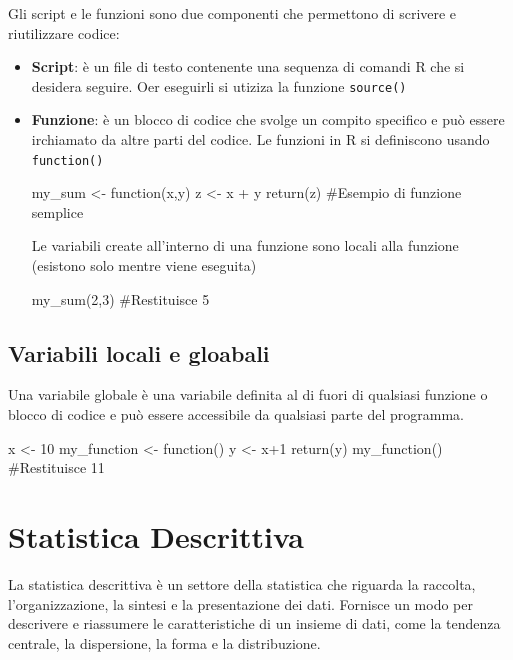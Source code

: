 Gli script e le funzioni sono due componenti che permettono di scrivere e riutilizzare codice:
\begin{itemize}
  \item \textbf{Script}: è un file di testo contenente una sequenza di comandi R che si desidera seguire. Oer eseguirli si utiziza la funzione \texttt{source()}
  \item \textbf{Funzione}: è un blocco di codice che svolge un compito specifico e può essere irchiamato da altre parti del codice. Le funzioni in R si definiscono usando \texttt{function()}
  
  \begin{codiceR}
    my_sum <- function(x,y){
      z <- x + y
      return(z)
      }
  #Esempio di funzione semplice
  \end{codiceR}
  Le variabili create all'interno di una funzione sono locali alla funzione (esistono solo mentre viene eseguita)

  \begin{codiceR}
    my_sum(2,3) #Restituisce 5
  \end{codiceR}
\end{itemize} 


\subsection{Variabili locali e gloabali}
Una variabile globale è una variabile definita al di fuori di qualsiasi funzione o blocco di codice e può essere accessibile da qualsiasi parte del programma.

\begin{codiceR}
  x <- 10
  my_function <- function(){
    y <- x+1
    return(y)
  }
  my_function() #Restituisce 11
\end{codiceR}






\section{Statistica Descrittiva}

La statistica descrittiva è un settore della statistica che riguarda la raccolta, l’organizzazione, la sintesi e la presentazione dei dati. Fornisce un modo per descrivere e riassumere le caratteristiche di un insieme di dati, come la tendenza centrale, la dispersione, la forma e la distribuzione.

